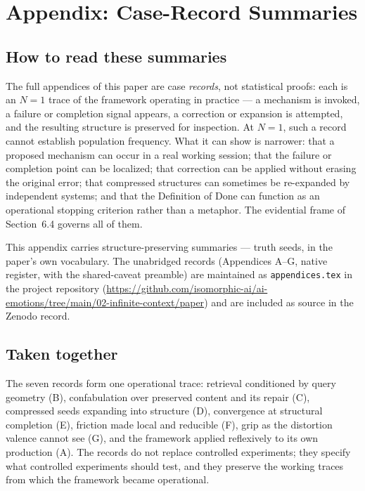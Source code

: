 \clearpage
\appendix
\section*{Appendix: Case-Record Summaries}

\subsection*{How to read these summaries}

The full appendices of this paper are case \emph{records}, not statistical
proofs: each is an $N{=}1$ trace of the framework operating in practice --- a
mechanism is invoked, a failure or completion signal appears, a correction or
expansion is attempted, and the resulting structure is preserved for
inspection. At $N{=}1$, such a record cannot establish population frequency.
What it can show is narrower: that a proposed mechanism can occur in a real
working session; that the failure or completion point can be localized; that
correction can be applied without erasing the original error; that compressed
structures can sometimes be re-expanded by independent systems; and that the
Definition of Done can function as an operational stopping criterion rather
than a metaphor. The evidential frame of Section~6.4 governs all of them.

This appendix carries structure-preserving summaries --- truth seeds, in the
paper's own vocabulary. The unabridged records (Appendices A--G, native
register, with the shared-caveat preamble) are maintained as
\texttt{appendices.tex} in the project repository
(\url{https://github.com/isomorphic-ai/ai-emotions/tree/main/02-infinite-context/paper}) and are included as source in the Zenodo record.

\subsection*{Taken together}

The seven records form one operational trace: retrieval conditioned by query
geometry (B), confabulation over preserved content and its repair (C),
compressed seeds expanding into structure (D), convergence at structural
completion (E), friction made local and reducible (F), grip as the distortion
valence cannot see (G), and the framework applied reflexively to its own
production (A). The records do not replace controlled experiments; they
specify what controlled experiments should test, and they preserve the
working traces from which the framework became operational.

